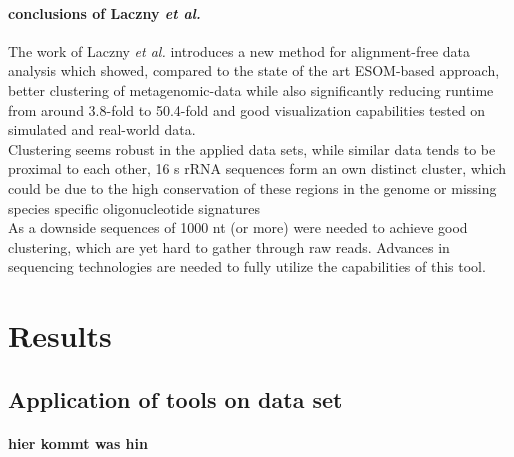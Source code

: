 \documentclass[twocolumn]{bmcart}%
\begin{document}
\paragraph*{conclusions of Laczny \textit{et al.}}
The work of Laczny \textit{et al.} introduces a new method for alignment-free data analysis which showed, compared to the state of the art ESOM-based approach, better clustering of metagenomic-data while also significantly reducing runtime from around 3.8-fold to 50.4-fold\cite{Laczny2014} and good visualization capabilities tested on simulated and real-world data.\\
Clustering seems robust in the applied data sets, while similar data tends to be proximal to each other, 16 s rRNA sequences form an own distinct cluster, which could be due to the high conservation of these regions in the genome or missing species specific oligonucleotide signatures\\
As a downside sequences of 1000 nt (or more) were needed to achieve good clustering, which are yet hard to gather through raw reads. Advances in sequencing technologies are needed to fully utilize the capabilities of this tool.
\section*{Results}
\subsection*{Application of tools on data set}
\paragraph*{hier kommt was hin}

\end{document}
